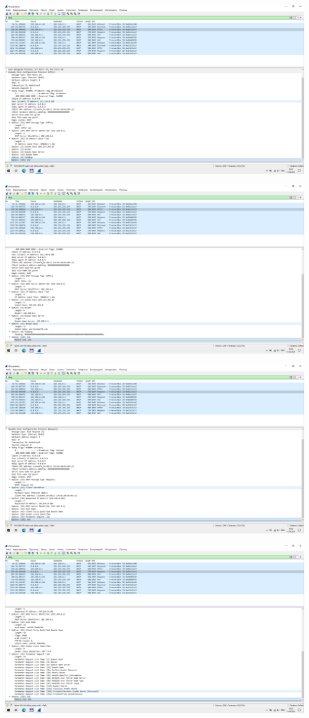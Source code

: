 \includegraphics[width=\textwidth]{screenshots/dhcp_offer_1}

\includegraphics[width=\textwidth]{screenshots/dhcp_offer_2}

\includegraphics[width=\textwidth]{screenshots/dhcp_request1_1}

\includegraphics[width=\textwidth]{screenshots/dhcp_request1_2}

